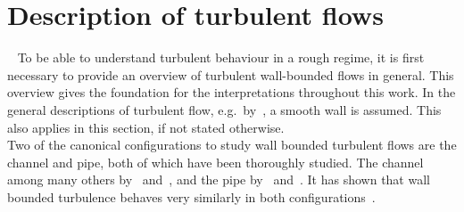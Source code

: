 \section{Description of turbulent flows}~\label{sec: Description of turbulent flows}
To be able to understand turbulent behaviour in a rough regime, it is first necessary to provide an overview of turbulent wall-bounded flows in general.
This overview gives the foundation for the interpretations throughout this work.
In the general descriptions of turbulent flow, e.g.\ by~\cite{popeTurbulentFlows2015}, a smooth wall is assumed.
This also applies in this section, if not stated otherwise.\\
Two of the canonical configurations to study wall bounded turbulent flows are the channel and pipe, both of which have been thoroughly studied.
The channel among many others by~\cite{kimTurbulenceStatisticsFully1987} and~\cite{leeDirectNumericalSimulation2015}, and the pipe by~\cite{jimenezCascadesWallBoundedTurbulence2012} and~\cite{yaoDirectNumericalSimulations2023}.
It has shown that wall bounded turbulence behaves very similarly in both configurations~\citep{khouryTurbulentPipeFlow2014, kimProgressPipeChannel2012}.
